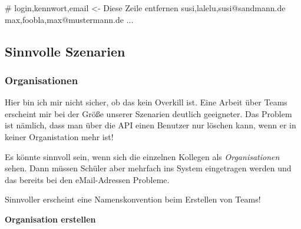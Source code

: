 \documentclass[
  letterpaper,
  DIV=11]{scrreprt}
\newenvironment{Shaded}{\begin{snugshade}}{\end{snugshade}}
\newcommand{\AttributeTok}[1]{\textcolor[rgb]{0.40,0.45,0.13}{#1}}
\newcommand{\CommentTok}[1]{\textcolor[rgb]{0.37,0.37,0.37}{#1}}
\newcommand{\DataTypeTok}[1]{\textcolor[rgb]{0.68,0.00,0.00}{#1}}
\newcommand{\ExtensionTok}[1]{\textcolor[rgb]{0.00,0.23,0.31}{#1}}
\newcommand{\NormalTok}[1]{\textcolor[rgb]{0.00,0.23,0.31}{#1}}
\newcommand{\OperatorTok}[1]{\textcolor[rgb]{0.37,0.37,0.37}{#1}}
\newcommand{\StringTok}[1]{\textcolor[rgb]{0.13,0.47,0.30}{#1}}
\newcommand{\VariableTok}[1]{\textcolor[rgb]{0.07,0.07,0.07}{#1}}
\begin{document}
\begin{Shaded}
\begin{Highlighting}[]
\CommentTok{\# login,kennwort,email  \textless{}{-} Diese Zeile entfernen}
\ExtensionTok{susi,lalelu,susi@sandmann.de}
\ExtensionTok{max,foobla,max@mustermann.de}
\ExtensionTok{...}
\end{Highlighting}
\end{Shaded}

\subsection{Sinnvolle Szenarien}\label{sinnvolle-szenarien}

\subsubsection{Organisationen}\label{organisationen}

Hier bin ich mir nicht sicher, ob das kein Overkill ist. Eine Arbeit
über Teams erscheint mir bei der Größe unserer Szenarien deutlich
geeigneter. Das Problem ist nämlich, dass man über die API einen
Benutzer nur löschen kann, wenn er in keiner Organistation mehr ist!

Es könnte sinnvoll sein, wenn sich die einzelnen Kollegen als
\emph{Organisationen} sehen. Dann müssen Schüler aber mehrfach ins
System eingetragen werden und das bereits bei den eMail-Adressen
Probleme.

Sinnvoller erscheint eine Namenskonvention beim Erstellen von Teams!

\textbf{Organisation erstellen}

\begin{Shaded}
\end{Shaded}
\end{document}
